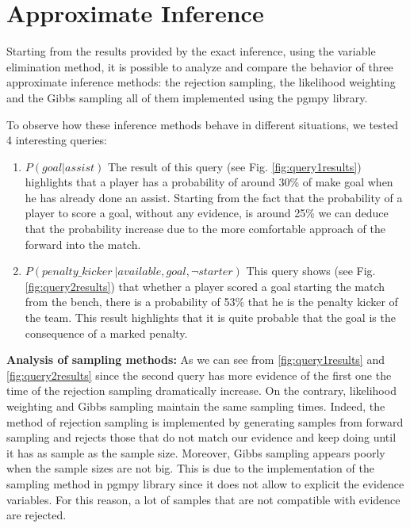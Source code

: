 \documentclass[a4paper,10pt]{report}
\begin{document}
\section{Approximate Inference}\label{sec:section-52}
Starting from the results provided by the exact inference, using the variable elimination method, it is possible to analyze and compare the behavior of three approximate inference methods: the rejection sampling, the likelihood weighting and the Gibbs sampling all of them implemented using the pgmpy library.


To observe how these inference methods behave in different situations, we tested 4 interesting queries:

\begin{enumerate}
    \item$P(goal|assist )$
    \newline
    The result of this query (see Fig. \ref{fig:query1results}) highlights that a player has a probability of around 30\% of make goal when he has already done an assist. Starting from the fact that the probability of a player to score a goal, without any evidence, is around 25\% we can deduce that the probability increase due to the more comfortable approach of the forward into the match.
          

    \item $P(penalty\_kicker\ | available, goal,\neg starter)$
    \newline
    This query shows (see Fig. \ref{fig:query2results}) that whether a player scored a goal starting the match from the bench, there is a probability of 53\% that he is the penalty kicker of the team. This result highlights that it is quite probable that the goal is the consequence of a marked penalty.
\end{enumerate}
    \textbf{Analysis of sampling methods:}
        \newline
        As we can see from \ref{fig:query1results} and \ref{fig:query2results} since the second query has more evidence of the first one the time of the rejection sampling dramatically increase. On the contrary, likelihood weighting and Gibbs sampling maintain the same sampling times. Indeed, the method of rejection sampling is implemented by generating samples from forward sampling and rejects those that do not match our evidence and keep doing until it has as sample as the sample size.
        Moreover, Gibbs sampling appears poorly when the sample sizes are not big. This is due to the implementation of the sampling method in pgmpy library since it does not allow to explicit the evidence variables. For this reason, a lot of samples that are not compatible with evidence are rejected.
\end{document}
